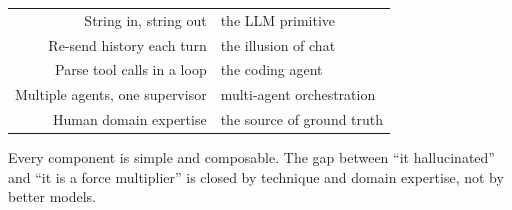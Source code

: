 \begin{keyresult}
  \begin{center}
  \begin{tabular}{r@{\;$\to$\;}l}
    String in, string out & the LLM primitive \\
    Re-send history each turn & the illusion of chat \\
    Parse tool calls in a loop & the coding agent \\
    Multiple agents, one supervisor & multi-agent orchestration \\
    Human domain expertise & the source of ground truth \\
  \end{tabular}
  \end{center}
  Every component is simple and composable.  The gap between ``it
  hallucinated'' and ``it is a force multiplier'' is closed by
  technique and domain expertise, not by better models.
\end{keyresult}
